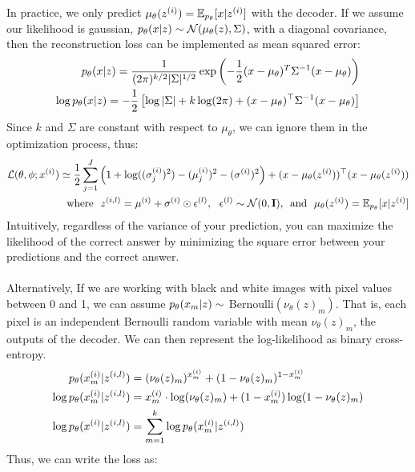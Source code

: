 \documentclass{article}
\begin{document}
In practice, we only predict $\mu_\theta(z^{(i)}) = \mathbb{E}_{p_\theta}[x|z^{(i)}]$ with the decoder. If we assume our likelihood is gaussian, $p_\theta(x|z) \sim \mathcal{N}(\mu_\theta(z), \Sigma)$, with a diagonal covariance, then the reconstruction loss can be implemented as mean squared error: 
\label{reconstruction_loss}
\begin{align}
    p_\theta(x|z) = \frac{1}{(2\pi)^{k/2}|\Sigma|^{1/2}} \exp\left(-\frac{1}{2} (x-\mu_\theta)^T \Sigma^{-1} (x-\mu_\theta)\right)\\
    \log p_\theta(x|z) = -\frac{1}{2}\left[ \log|\Sigma| + k\log(2\pi) + (x-\mu_\theta)^\top\Sigma^{-1}(x-\mu_\theta) \right]
\end{align}
Since $k$ and $\Sigma$ are constant with respect to $\mu_\theta$, we can ignore them in the optimization process, thus:
\begin{align}
    \mathcal{L}(\theta,\phi;x^{(i)}) \simeq \frac{1}{2}\sum_{j=1}^J\left(  1 + \log((\sigma_j^{(i)})^2)-(\mu_j^{(i)})^2 - (\sigma^{(i)})^2\right) + (x-\mu_\theta(z^{(i)}))^\top(x-\mu_\theta(z^{(i)}))\\
    \text{~~where~~} z^{(i,l)} = \mu^{(i)} + \sigma^{(i)} \odot \epsilon^{(l)}, ~~ \epsilon^{(l)}\sim\mathcal{N}(0,\mathbf{I}) \text{,~~and~~} \mu_\theta(z^{(i)}) = \mathbb{E}_{p_\theta}[x|z^{(i)}]\notag
\end{align}
Intuitively, regardless of the variance of your prediction, you can maximize the likelihood of the correct answer by minimizing the square error between your predictions and the correct answer. \\\\
Alternatively, If we are working with black and white images with pixel values between 0 and 1, we can assume $p_\theta(x_m|z) \sim $ Bernoulli$(\nu_\theta(z)_m)$. That is, each pixel is an independent Bernoulli random variable with mean $\nu_\theta(z)_m$, the outputs of the decoder. We can then represent the log-likelihood as binary cross-entropy.
\begin{align}
    p_\theta(x^{(i)}_m|z^{(i,l)}) &= (\nu_\theta(z)_m)^{x^{(i)}_m} + (1- \nu_\theta(z)_m)^{1-x^{(i)}_m} \\
    \log p_\theta(x^{(i)}_m|z^{(i,l)}) &= x^{(i)}_m \cdot \log(\nu_\theta(z)_m) + (1 - x^{(i)}_m) \log(1- \nu_\theta(z)_m) \\
    \log p_\theta(x^{(i)}|z^{(i,l)}) &= \sum_{m=1}^k \log p_\theta(x^{(i)}_m|z^{(i,l)})
\end{align}
Thus, we can write the loss as:
\end{document}
